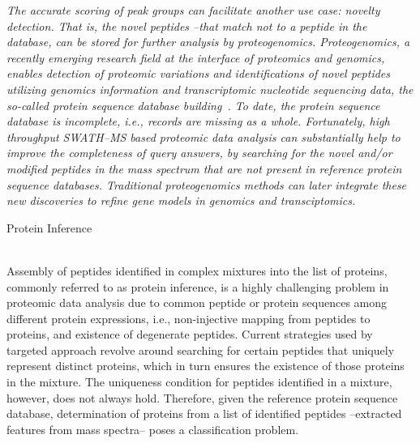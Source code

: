 \documentclass{nature}
\begin{document}
\begin{enumerate}
    {\it The accurate scoring of peak groups can facilitate another use case: novelty detection. That is, the novel peptides --that match not to a peptide in the database, can be stored for further analysis by proteogenomics. Proteogenomics, a recently emerging research field at the interface of proteomics and genomics, enables detection of proteomic variations and identifications of novel peptides utilizing genomics information and transcriptomic nucleotide sequencing data, the so-called protein sequence database building~\cite{Nesvizhskii2014Proteogenomics}. To date, the protein sequence database is incomplete, i.e., records are missing as a whole. Fortunately, high throughput SWATH--MS based proteomic data analysis can substantially help to improve the completeness of query answers, by searching for the novel and/or modified peptides in the mass spectrum that are not present in reference protein sequence databases. Traditional proteogenomics methods can later integrate these new discoveries to refine gene models in genomics and transciptomics.
    
    }
    
   
    {\bf \item Protein Inference}\\
    Assembly of peptides identified in complex mixtures into the list of proteins, commonly referred to as protein inference, is a highly challenging problem in proteomic data analysis due to common peptide or protein sequences among different protein expressions, i.e., non-injective mapping from peptides to proteins, and existence of degenerate peptides. Current strategies used by targeted approach revolve around searching for certain peptides that uniquely represent distinct proteins, which in turn ensures the existence of those proteins in the mixture. The uniqueness condition for peptides identified in a mixture, however, does not always hold. Therefore, given the reference protein sequence database, determination of proteins from a list of identified peptides --extracted features from mass spectra-- poses a classification problem.
   

\end{enumerate}
\end{document}
